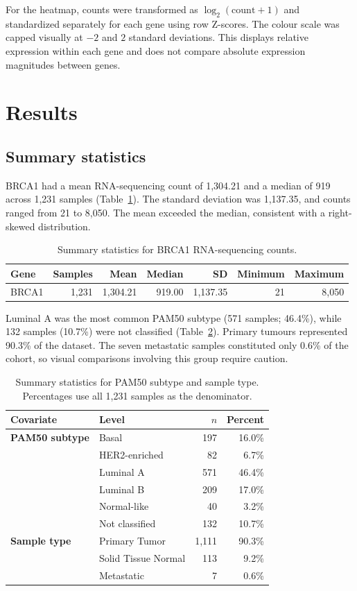 \documentclass[11pt]{article}
\begin{document}
For the heatmap, counts were transformed as $\log_2(\mathrm{count}+1)$ and standardized separately for each gene using row Z-scores. The colour scale was capped visually at $-2$ and $2$ standard deviations. This displays relative expression within each gene and does not compare absolute expression magnitudes between genes.

\section{Results}

\subsection{Summary statistics}

BRCA1 had a mean RNA-sequencing count of 1,304.21 and a median of 919 across 1,231 samples (Table~\ref{tab:brca1}). The standard deviation was 1,137.35, and counts ranged from 21 to 8,050. The mean exceeded the median, consistent with a right-skewed distribution.

\begin{table}[H]
\centering
\caption{Summary statistics for BRCA1 RNA-sequencing counts.}
\label{tab:brca1}
\small
\begin{tabular}{lrrrrrr}
\toprule
Gene & Samples & Mean & Median & SD & Minimum & Maximum \\
\midrule
BRCA1 & 1,231 & 1,304.21 & 919.00 & 1,137.35 & 21 & 8,050 \\
\bottomrule
\end{tabular}
\end{table}

Luminal A was the most common PAM50 subtype (571 samples; 46.4\%), while 132 samples (10.7\%) were not classified (Table~\ref{tab:covariates}). Primary tumours represented 90.3\% of the dataset. The seven metastatic samples constituted only 0.6\% of the cohort, so visual comparisons involving this group require caution.

\begin{table}[H]
\centering
\caption{Summary statistics for PAM50 subtype and sample type. Percentages use all 1,231 samples as the denominator.}
\label{tab:covariates}
\small
\begin{tabularx}{0.78\textwidth}{>{\bfseries}lXrr}
\toprule
Covariate & Level & $n$ & Percent \\
\midrule
PAM50 subtype & Basal & 197 & 16.0\% \\
 & HER2-enriched & 82 & 6.7\% \\
 & Luminal A & 571 & 46.4\% \\
 & Luminal B & 209 & 17.0\% \\
 & Normal-like & 40 & 3.2\% \\
 & Not classified & 132 & 10.7\% \\
\addlinespace
Sample type & Primary Tumor & 1,111 & 90.3\% \\
 & Solid Tissue Normal & 113 & 9.2\% \\
 & Metastatic & 7 & 0.6\% \\
\bottomrule
\end{tabularx}
\end{table}
\end{document}
